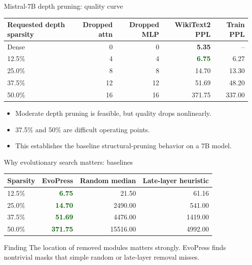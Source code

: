 \documentclass[aspectratio=169]{beamer}
\newcommand{\good}[1]{\textcolor{darkgreen}{\textbf{#1}}}
\begin{document}
\begin{frame}{Mistral-7B depth pruning: quality curve}
\begin{table}
\centering
\begin{tabular}{lrrrr}
\toprule
Requested depth sparsity & Dropped attn & Dropped MLP & WikiText2 PPL & Train PPL \\
\midrule
Dense & 0 & 0 & \textbf{5.35} & -- \\
12.5\% & 4 & 4 & \good{6.75} & 6.27 \\
25.0\% & 8 & 8 & 14.70 & 13.30 \\
37.5\% & 12 & 12 & 51.69 & 48.20 \\
50.0\% & 16 & 16 & 371.75 & 337.00 \\
\bottomrule
\end{tabular}
\end{table}

\vspace{0.2cm}
\begin{itemize}
    \item Moderate depth pruning is feasible, but quality drops nonlinearly.
    \item 37.5\% and 50\% are difficult operating points.
    \item This establishes the baseline structural-pruning behavior on a 7B model.
\end{itemize}
\end{frame}


\begin{frame}{Why evolutionary search matters: baselines}
\begin{table}
\centering
\begin{tabular}{lrrr}
\toprule
Sparsity & EvoPress & Random median & Late-layer heuristic \\
\midrule
12.5\% & \good{6.75} & 21.50 & 61.16 \\
25.0\% & \good{14.70} & 2490.00 & 541.00 \\
37.5\% & \good{51.69} & 4476.00 & 1419.00 \\
50.0\% & \good{371.75} & 15516.00 & 4992.00 \\
\bottomrule
\end{tabular}
\end{table}

\vspace{0.2cm}
\begin{block}{Finding}
The location of removed modules matters strongly. EvoPress finds nontrivial masks that simple random or late-layer removal misses.
\end{block}
\end{frame}
\end{document}
